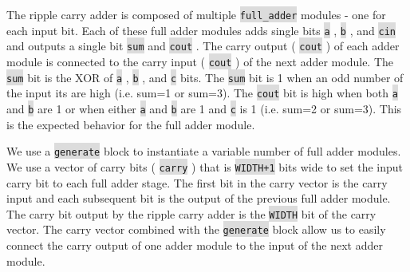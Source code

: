 \documentclass[fleqn]{article}
\newcommand{\code}[1]{%
	\colorbox{Gainsboro}{\texttt{#1}}%
}
\begin{document}
\begin{enumerate}
		The ripple carry adder is composed of multiple \code{full\_adder} modules - one for each input bit. Each of these full adder modules adds single bits \code{a}, \code{b}, and \code{cin} and outputs a single bit \code{sum} and \code{cout}. The carry output (\code{cout}) of each adder module is connected to the carry input (\code{cout}) of the next adder module. The \code{sum} bit is the XOR of \code{a}, \code{b}, and \code{c} bits. The \code{sum} bit is 1 when an odd number of the input its are high (i.e. sum=1 or sum=3). The \code{cout} bit is high when both \code{a} and \code{b} are 1 or when either \code{a} and \code{b} are 1 and \code{c} is 1 (i.e. sum=2 or sum=3). This is the expected behavior for the full adder module.
		
		We use a \code{generate} block to instantiate a variable number of full adder modules. We use a vector of carry bits (\code{carry}) that is \code{WIDTH+1} bits wide to set the input carry bit to each full adder stage. The first bit in the carry vector is the carry input and each subsequent bit is the output of the previous full adder module. The carry bit output by the ripple carry adder is the \code{WIDTH} bit of the carry vector. The carry vector combined with the \code{generate} block allow us to easily connect the carry output of one adder module to the input of the next adder module.
		 

	\end{enumerate}
	

\end{document}
